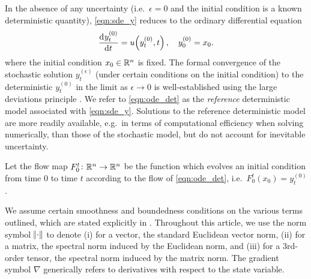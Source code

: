In the absence of any uncertainty (i.e.\ \(\epsilon = 0\) and the initial condition is a known deterministic quantity), \cref{eqn:sde_y} reduces to the ordinary differential equation
\begin{equation}
	\dod{y_t^{(0)}}{t} = u\!\left(y_t^{(0)}, t\right), \quad y_0^{(0)} = x_0.
	\label{eqn:ode_det}
\end{equation}
where the initial condition \(x_0 \in \mathbb{R}^n\) is fixed.
The formal convergence of the stochastic solution \(y_t^{(\epsilon)}\) (under certain conditions on the initial condition) to the deterministic \(y_{t}^{(0)}\) in the limit as \(\epsilon \to 0\) is well-established using the large deviations principle \citep[e.g]{FreidlinWentzell_1998_RandomPerturbationsDynamical}.
We refer to \cref{eqn:ode_det} as the \emph{reference} deterministic model associated with \cref{eqn:sde_y}.
Solutions to the reference deterministic model are more readily available, e.g.\ in terms of computational efficiency when solving numerically, than those of the stochastic model, but do not account for inevitable uncertainty.

Let the flow map \(F_{0}^{t}\colon \mathbb{R}^n \to \mathbb{R}^n\) be the function which evolves an initial condition from time \(0\) to time \(t\) according to the flow of \cref{eqn:ode_det}, i.e.\ \(F_0^t\!\left(x_0\right) = y_t^{(0)}\).

We assume certain smoothness and boundedness conditions on the various terms outlined, which are stated explicitly in .
Throughout this article, we use the norm symbol \(\norm{\cdot}\) to denote (i) for a vector, the standard Euclidean vector norm, (ii) for a matrix, the spectral norm induced by the Euclidean norm, and (iii) for a 3rd-order tensor, the spectral norm induced by the matrix norm.
The gradient symbol \(\nabla\) generically refers to derivatives with respect to the state variable.

